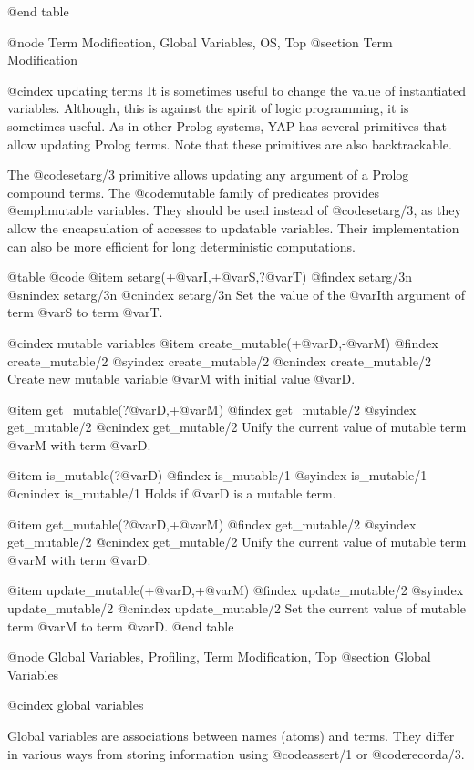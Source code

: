 {{{{{{@end table

@node Term Modification, Global Variables, OS, Top
@section Term Modification

@cindex updating terms
It is sometimes useful to change the value of instantiated
variables. Although, this is against the spirit of logic programming, it
is sometimes useful. As in other Prolog systems, YAP has
several primitives that allow updating Prolog terms. Note that these
primitives are also backtrackable.

The @code{setarg/3} primitive allows updating any argument of a Prolog
compound terms. The @code{mutable} family of predicates provides
@emph{mutable variables}. They should be used instead of @code{setarg/3},
as they allow the encapsulation of accesses to updatable
variables. Their implementation can also be more efficient for long
deterministic computations.

@table @code
@item setarg(+@var{I},+@var{S},?@var{T})
@findex setarg/3n
@snindex setarg/3n
@cnindex setarg/3n
Set the value of the @var{I}th argument of term @var{S} to term @var{T}. 

@cindex mutable variables
@item create_mutable(+@var{D},-@var{M})
@findex create_mutable/2
@syindex create_mutable/2
@cnindex create_mutable/2
Create new mutable variable @var{M} with initial value @var{D}.

@item get_mutable(?@var{D},+@var{M})
@findex get_mutable/2
@syindex get_mutable/2
@cnindex get_mutable/2
Unify the current value of mutable term @var{M} with term @var{D}.

@item is_mutable(?@var{D})
@findex is_mutable/1
@syindex is_mutable/1
@cnindex is_mutable/1
Holds if @var{D} is a mutable term.

@item get_mutable(?@var{D},+@var{M})
@findex get_mutable/2
@syindex get_mutable/2
@cnindex get_mutable/2
Unify the current value of mutable term @var{M} with term @var{D}.

@item update_mutable(+@var{D},+@var{M})
@findex update_mutable/2
@syindex update_mutable/2
@cnindex update_mutable/2
Set the current value of mutable term @var{M} to term @var{D}.
@end table

@node Global Variables, Profiling, Term Modification, Top
@section Global Variables

@cindex global variables

Global variables are associations between names (atoms) and
terms. They differ in various ways from storing information using
@code{assert/1} or @code{recorda/3}.

}}}}}}

